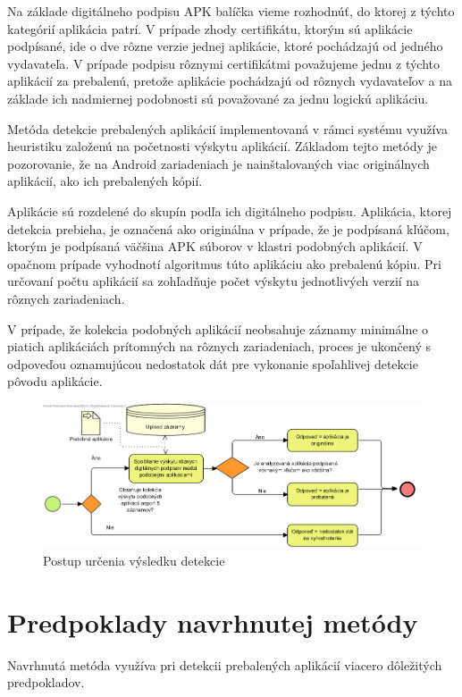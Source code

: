 Na základe digitálneho podpisu APK balíčka vieme rozhodnúť, do ktorej z týchto kategórií aplikácia patrí. V prípade zhody certifikátu, ktorým sú aplikácie podpísané, ide o dve rôzne verzie jednej aplikácie, ktoré pochádzajú od jedného vydavateľa. V prípade podpisu rôznymi certifikátmi považujeme jednu z týchto aplikácií za prebalenú, pretože aplikácie pochádzajú od rôznych vydavateľov a na základe ich nadmiernej podobnosti sú považované za jednu logickú aplikáciu.

Metóda detekcie prebalených aplikácií implementovaná v rámci systému  využíva heuristiku založenú na početnosti výskytu aplikácií. Základom tejto metódy je pozorovanie, že na Android zariadeniach je nainštalovaných viac originálnych aplikácií, ako ich prebalených kópií.

Aplikácie sú rozdelené do skupín podľa ich digitálneho podpisu. Aplikácia, ktorej detekcia prebieha, je označená ako originálna v prípade, že je podpísaná kľúčom, ktorým je podpísaná väčšina APK súborov v klastri podobných aplikácií.  V opačnom prípade vyhodnotí algoritmus túto aplikáciu ako prebalenú kópiu. Pri určovaní počtu aplikácií sa zohľadňuje počet výskytu jednotlivých verzií na rôznych zariadeniach. 

V prípade, že kolekcia podobných aplikácií neobsahuje záznamy minimálne o piatich aplikáciách prítomných na rôznych zariadeniach, proces je ukončený s odpoveďou oznamujúcou nedostatok dát pre vykonanie spoľahlivej detekcie pôvodu aplikácie.

\begin{figure}[htb]
  \begin{center}
    \includegraphics[width=130mm]{images/detection-original.png}
  \end{center}
  \caption{Postup určenia výsledku detekcie}
  \label{fig:detectionOriginal}
\end{figure}

\section{Predpoklady navrhnutej metódy}
Navrhnutá metóda využíva pri detekcii prebalených aplikácií viacero dôležitých predpokladov.

